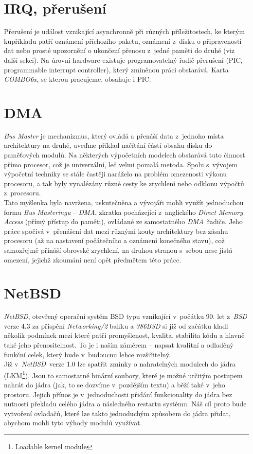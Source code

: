 \documentclass[final,11pt]{fithesis}
\newcommand{\comx}{\emph{COMBO6x}}
\newcommand{\nbsd}{\emph{NetBSD}}
\newcommand{\dma}{\emph{DMA}}
\begin{document}
  \section{IRQ, přerušení}
  Přerušení je událost vznikající asynchronně při různých
  příležitostech, ke
  kterým kupříkladu patří oznámení příchozího paketu, oznámení z~disku o
  připravenosti dat nebo prosté upozornění o ukončení přenosu z~jedné paměti do
  druhé (viz další sekci). Na úrovni hardware existuje programovatelný řadič
  přerušení (PIC, programmable interrupt controller), který zmíněnou práci
  obstarává. Karta \comx, se kterou pracujeme, obsahuje i PIC.
  \section{DMA}
  \emph{Bus Master} je mechanizmus, který ovládá a přenáší data z~jednoho místa
  architektury na druhé, uveďme příklad načítání částí obsahu disku do
  paměťových modulů. Na některých výpočetních modelech obstarává tuto činnost
  přímo procesor, což je univerzální, leč velmi pomalá metoda. Spolu
  s~vývojem výpočetní techniky se stále častěji naráželo na problém omezenosti
  výkonu procesoru, a tak byly vynalézány různé cesty ke zrychlení nebo
  odklonu výpočtů z~procesoru. \\ \indent
  Tato myšlenka byla navržena, uskutečněna
  a vývojáři mohli využít jednoduchou formu \emph{Bus Masteringu} -- \dma,
  zkratka pocházející z~anglického \emph{Direct Memory Access} (přímý
  přístup do paměti), ovládané ze
  samostatného \dma\ řadiče. Jeho práce spočívá v~přenášení dat mezi
  různými kouty architektury bez zásahu procesoru (až na nastavení počátečního
  a oznámení konečného stavu), což samozřejmě přináší
  obrovské zrychlení, na druhou stranou s~sebou nese jistá omezení, jejichž
  zkoumání není opět předmětem této práce. \\ \indent
  \section{NetBSD}
  \nbsd\cite{nbsd}, otevřený operační systém BSD typu vznikající
  v~počátku 90. let z~\emph{BSD} verze 4.3 za přispění \emph{Networking/2}
  balíku
  a \emph{386BSD} si již od začátku kladl několik
  podmínek mezi které patří promyšlenost, kvalita, stabilita kódu a hlavně
  také jeho přenositelnost. To je i naším záměrem -- napsat kvalitní a
  odladěný funkční celek, který bude v~budoucnu lehce rozšiřitelný. \\ \indent
  Již v~\nbsd\ verze 1.0 lze spatřit zmínky o nahratelných modulech do jádra
  (LKM\footnote{Loadable kernel module}). Jsou to
  samostatné binární soubory, které je možné určitým postupem nahrát do jádra
  (jak, to se dozvíme v~pozdějším textu) a běží také v~jeho prostoru.
  Jejich přínos je v~jednoduchosti přidání funkcionality do jádra bez nutnosti
  překladu celého jádra a následného restartu systému. Náš cíl proto bude
  vytvoření ovladačů, které lze takto jednoduchým způsobem do jádra přidat,
  abychom mohli tyto výhody modulů využívat.
\end{document}
